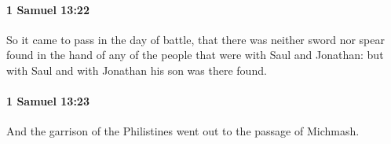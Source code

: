 		\paragraph{1 Samuel 13:22} %
			\label{1SAMUEL-13-22}

			So it came to pass in the day of battle, that there was neither sword nor spear found in the hand of any of the people that were with Saul and Jonathan: but with Saul and with Jonathan his son was there found.


		\paragraph{1 Samuel 13:23} %
			\label{1SAMUEL-13-23}

			And the garrison of the Philistines went out to the passage of Michmash.

